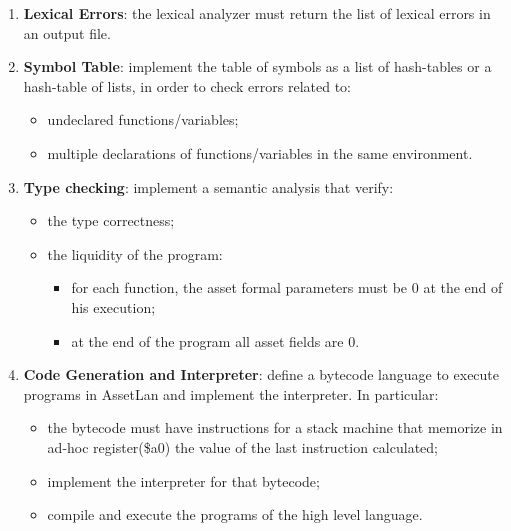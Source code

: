 \documentclass[11pt]{article} %
\begin{document}
\begin{enumerate}
\item \textbf{Lexical Errors}: the lexical analyzer must return the list of lexical errors in an output file. 
\item \textbf{Symbol Table}: implement the table of symbols as a list of hash-tables or a hash-table of lists, in order to check errors related to:
\begin{itemize}
\item undeclared functions/variables;
\item multiple declarations of functions/variables in the same environment.
\end{itemize}
\item \textbf{Type checking}: implement a semantic analysis that verify:
\begin{itemize}
\item the type correctness;
\item the liquidity of the program:
\begin{itemize}
\item for each function, the asset formal parameters must be $0$ at the end of his execution;
\item at the end of the program all asset fields are $0$.
\end{itemize} 
\end{itemize}
\item \textbf{Code Generation and Interpreter}: define a bytecode language to execute programs in AssetLan and implement the interpreter. In particular:
\begin{itemize}
\item the bytecode must have instructions for a stack machine that memorize in ad-hoc register(\$a0) the value of the last instruction calculated;
\item implement the interpreter for that bytecode;
\item compile and execute the programs of the high level language.
\end{itemize} 
\end{enumerate}
\end{document}
